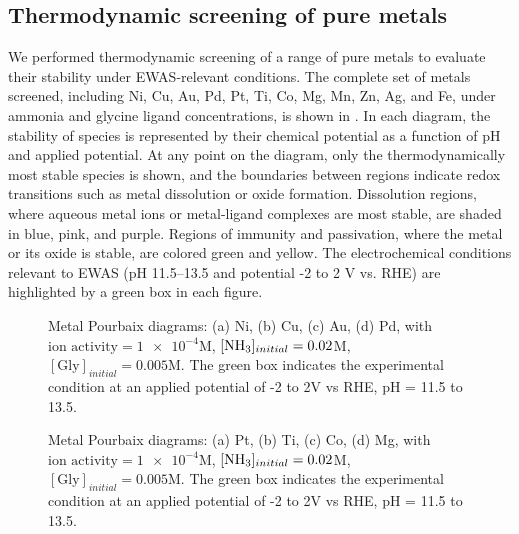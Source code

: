 \documentclass[journal=jacsat,manuscript=article]{achemso}
\begin{document}
\subsection{Thermodynamic screening of pure metals}
We performed thermodynamic screening of a range of pure metals to evaluate their stability under EWAS-relevant conditions. The complete set of metals screened, including Ni, Cu, Au, Pd, Pt, Ti, Co, Mg, Mn, Zn, Ag, and Fe, under ammonia and glycine ligand concentrations, is shown in . In each diagram, the stability of species is represented by their chemical potential as a function of pH and applied potential. At any point on the diagram, only the thermodynamically most stable species is shown, and the boundaries between regions indicate redox transitions such as metal dissolution or oxide formation. Dissolution regions, where aqueous metal ions or metal-ligand complexes are most stable, are shaded in blue, pink, and purple. Regions of immunity and passivation, where the metal or its oxide is stable, are colored green and yellow. The electrochemical conditions relevant to EWAS (pH 11.5–13.5 and potential -2 to 2 V vs. RHE) are highlighted by a green box in each figure.
\begin{figure}[htbp]
\centering
{}
\caption{Metal Pourbaix diagrams: (a) Ni, (b) Cu, (c) Au, (d) Pd, with $\text{ion activity}=\num{1e-4}$M, $[\ce{NH3}]_{initial}= 0.02$M, $[\text{Gly}]_{initial}=0.005$M. The green box indicates the experimental condition at an applied potential of -2 to 2V vs RHE, pH = 11.5 to 13.5.}
\label{fig:metal_pourbaix_collage_1}
\end{figure}

\begin{figure}[htbp]
\centering
{}
\caption{Metal Pourbaix diagrams: (a) Pt, (b) Ti, (c) Co, (d) Mg, with $\text{ion activity}=\num{1e-4}$M, $[\ce{NH3}]_{initial}= 0.02$M, $[\text{Gly}]_{initial}=0.005$M. The green box indicates the experimental condition at an applied potential of -2 to 2V vs RHE, pH = 11.5 to 13.5.}
\label{fig:metal_pourbaix_collage_2}
\end{figure}
\end{document}

